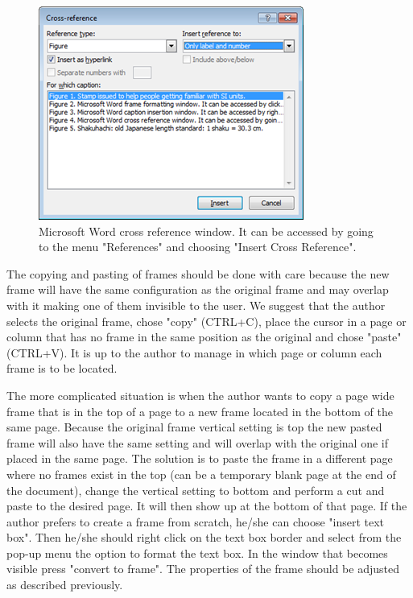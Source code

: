 \documentclass[10pt]{style_src/imeko_acta}
\begin{document}
\begin{figure}[!t]
	\centering
	\includegraphics[width=\columnwidth]{image4}
	\caption{Microsoft Word cross reference window. It can be accessed by going to the menu "References" and choosing "Insert Cross Reference".}
	\label{fig:image4}
\end{figure}







The copying and pasting of frames should be done with care because the new frame will have the same configuration as the original frame and may overlap with it making one of them invisible to the user. We suggest that the author selects the original frame, chose "copy" (CTRL+C), place the cursor in a page or column that has no frame in the same position as the original and chose "paste" (CTRL+V). It is up to the author to manage in which page or column each frame is to be located.

The more complicated situation is when the author wants to copy a page wide frame that is in the top of a page to a new frame located in the bottom of the same page. Because the original frame vertical setting is top the new pasted frame will also have the same setting and will overlap with the original one if placed in the same page. The solution is to paste the frame in a different page where no frames exist in the top (can be a temporary blank page at the end of the document), change the vertical setting to bottom and perform a cut and paste to the desired page. It will then show up at the bottom of that page.
If the author prefers to create a frame from scratch, he/she can choose "insert text box". Then he/she should right click on the text box border and select from the pop-up menu the option to format the text box. In the window that becomes visible press "convert to frame". The properties of the frame should be adjusted as described previously.
\end{document}
